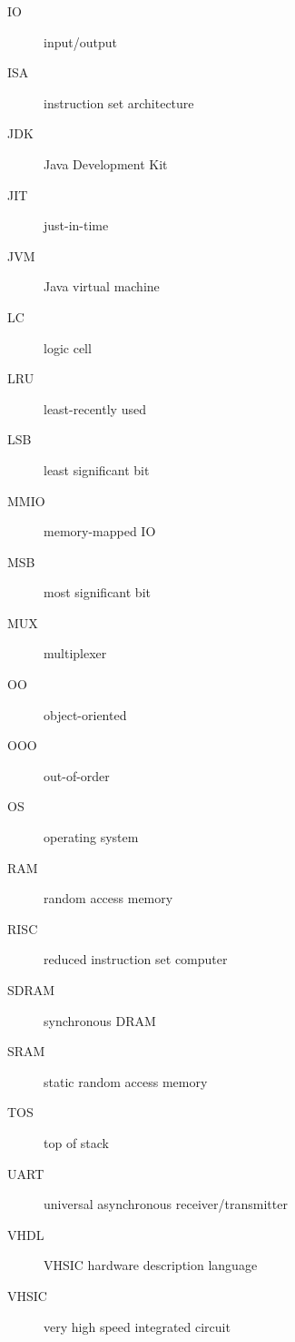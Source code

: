 \documentclass[%
    10pt,
    headinclude, footexclude,
    openright, %
    notitlepage,
    cleardoubleempty,
    headsepline,
    pointlessnumbers,
    bibtotoc, idxtotoc,
    ]{scrbook}
\begin{document}
\begin{description}
\item [IO] input/output
\item [ISA] instruction set architecture
\item [JDK] Java Development Kit
\item [JIT] just-in-time
\item [JVM] Java virtual machine
\item [LC] logic cell
\item [LRU] least-recently used
\item [LSB] least significant bit
\item [MMIO] memory-mapped IO
\item [MSB] most significant bit
\item [MUX] multiplexer
\item [OO] object-oriented
\item [OOO] out-of-order
\item [OS] operating system
\item [RAM] random access memory
\item [RISC] reduced instruction set computer
\item [SDRAM] synchronous DRAM
\item [SRAM] static random access memory
\item [TOS] top of stack
\item [UART] universal asynchronous receiver/transmitter
\item [VHDL] VHSIC hardware description language
\item [VHSIC] very high speed integrated circuit
\end{description}





\hypertarget{index}{}
\printindex
\end{document}
